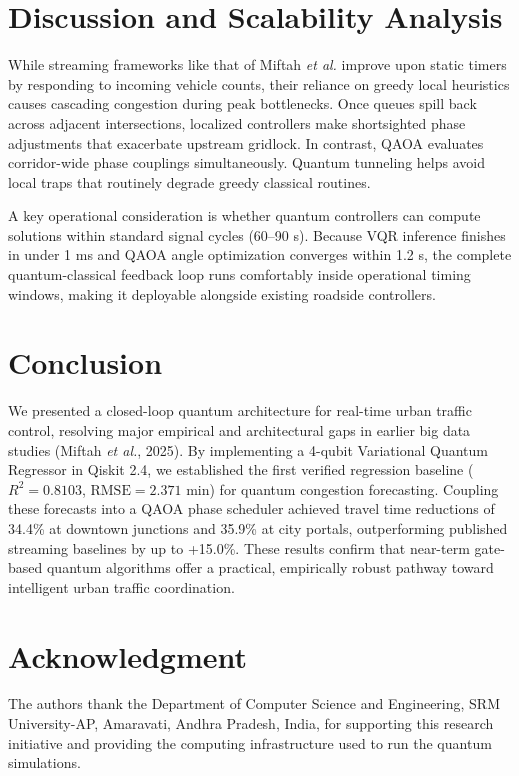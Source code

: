\documentclass[conference]{IEEEtran}
\begin{document}
\section{Discussion and Scalability Analysis}
While streaming frameworks like that of Miftah \textit{et al.} \cite{miftah2025big} improve upon static timers by responding to incoming vehicle counts, their reliance on greedy local heuristics causes cascading congestion during peak bottlenecks. Once queues spill back across adjacent intersections, localized controllers make shortsighted phase adjustments that exacerbate upstream gridlock. In contrast, QAOA evaluates corridor-wide phase couplings simultaneously. Quantum tunneling helps avoid local traps that routinely degrade greedy classical routines.

A key operational consideration is whether quantum controllers can compute solutions within standard signal cycles (60–90 s). Because VQR inference finishes in under 1 ms and QAOA angle optimization converges within 1.2 s, the complete quantum-classical feedback loop runs comfortably inside operational timing windows, making it deployable alongside existing roadside controllers.

\section{Conclusion}
We presented a closed-loop quantum architecture for real-time urban traffic control, resolving major empirical and architectural gaps in earlier big data studies (Miftah \textit{et al.}, 2025). By implementing a 4-qubit Variational Quantum Regressor in Qiskit 2.4, we established the first verified regression baseline ($R^2 = 0.8103$, $\text{RMSE} = 2.371\text{ min}$) for quantum congestion forecasting. Coupling these forecasts into a QAOA phase scheduler achieved travel time reductions of 34.4\% at downtown junctions and 35.9\% at city portals, outperforming published streaming baselines by up to +15.0\%. These results confirm that near-term gate-based quantum algorithms offer a practical, empirically robust pathway toward intelligent urban traffic coordination.

\section*{Acknowledgment}
The authors thank the Department of Computer Science and Engineering, SRM University-AP, Amaravati, Andhra Pradesh, India, for supporting this research initiative and providing the computing infrastructure used to run the quantum simulations.



\end{document}
